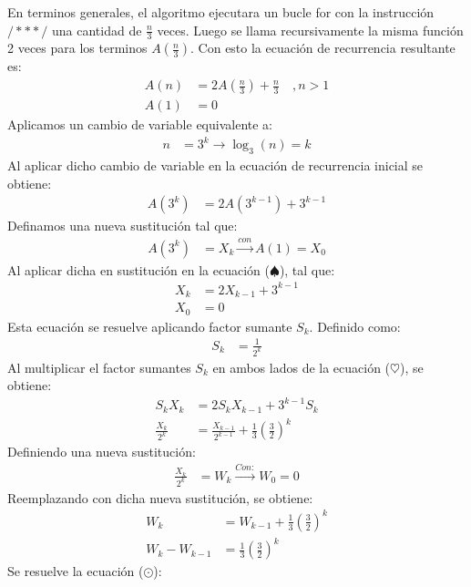 \begin{solution}
En terminos generales, el algoritmo ejecutara un bucle for con la instrucción $/***/$ una cantidad de $\frac{n}{3}$ veces. Luego se llama recursivamente la misma función 2 veces para los terminos $A(\frac{n}{3})$.
Con esto la ecuación de recurrencia resultante es:
\begin{align*}
    A(n) &= 2A\left(\frac{n}{3}\right) + \frac{n}{3}\quad, n>1 \\
    A(1)&=0
\end{align*}
Aplicamos un cambio de variable equivalente a:
\begin{align*}
    n &= 3^k  \xrightarrow{} \log_3(n)=k
\end{align*}
Al aplicar dicho cambio de variable en la ecuación de recurrencia inicial se obtiene:
\begin{align*}
    A(3^k) &= 2A(3^{k-1}) + 3^{k-1} \tag{$\spadesuit$}
\end{align*}
Definamos una nueva sustitución tal que:
\begin{align*}
    A(3^k) &= X_k \xrightarrow{con} A(1)=X_0
\end{align*}
Al aplicar dicha en sustitución en la ecuación ($\spadesuit$), tal que:
\begin{align*}
    X_k &= 2X_{k-1} + 3^{k-1} \tag{$\heartsuit$} \\
    X_0 &=0
\end{align*}
Esta ecuación se resuelve aplicando factor sumante $S_k$. Definido como:
\begin{align*}
    S_k &= \frac{1}{2^k}
\end{align*}
Al multiplicar el factor sumantes $S_k$ en ambos lados de la ecuación ($\heartsuit$), se obtiene:
\begin{align*}
    S_k X_k &= 2 S_k X_{k-1} + 3^{k-1} S_k\\
    \frac{X_k}{2^k} &= \frac{X_{k-1}}{2^{k-1}} + \frac{1}{3} \left(\frac{3}{2}\right)^k
\end{align*}
Definiendo una nueva sustitución:
\begin{align*}
    \frac{X_k}{2^k}&=W_k \xrightarrow{Con:} W_0=0
\end{align*}
Reemplazando con dicha nueva sustitución, se obtiene:
\begin{align*}
    W_k &= W_{k-1} + \frac{1}{3}\left(\frac{3}{2}\right)^k\\
    W_k - W_{k-1}  &= \frac{1}{3}\left(\frac{3}{2}\right)^k \tag{$\odot$}
\end{align*}
Se resuelve la ecuación ($\odot$):
\begin{align*}

\end{align*}
\end{solution}
